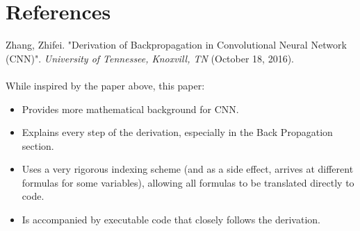 \documentclass[12pt]{article}
\begin{document}
\section*{References}
Zhang, Zhifei. "Derivation of Backpropagation in
Convolutional Neural Network (CNN)". \textit{University of Tennessee, Knoxvill, TN} (October 18, 2016).
\\
\\
While inspired by the paper above, this paper:
\begin{itemize}
    \item Provides more mathematical background for CNN.
    \item Explains every step of the derivation, especially in the Back Propagation section.
    \item Uses a very rigorous indexing scheme (and as a side effect, arrives at different formulas for some variables), allowing all formulas to be translated directly to code.
    \item Is accompanied by executable code that closely follows the derivation.
\end{itemize}
\end{document}
